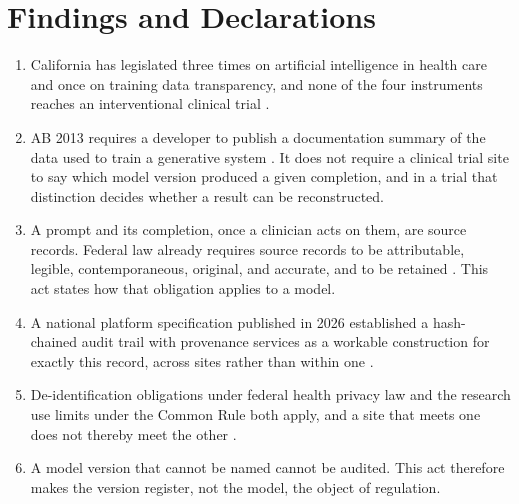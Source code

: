 
\section{Findings and Declarations}

\begin{enumerate}
\item California has legislated three times on artificial intelligence in
  health care and once on training data transparency, and none of the four
  instruments reaches an interventional clinical trial
  \cite{ab3030_2024,ab489_2025,sb1120_2024,ab2013_2024}.

\item AB 2013 requires a developer to publish a documentation summary of the
  data used to train a generative system \cite{ab2013_2024}. It does not require
  a clinical trial site to say which model version produced a given completion,
  and in a trial that distinction decides whether a result can be reconstructed.

\item A prompt and its completion, once a clinician acts on them, are source
  records. Federal law already requires source records to be attributable,
  legible, contemporaneous, original, and accurate, and to be retained
  \cite{cfr11,cfr312}. This act states how that obligation applies to a model.

\item A national platform specification published in 2026 established a
  hash-chained audit trail with provenance services as a workable construction
  for exactly this record, across sites rather than within one
  \cite{natplatform2026}.

\item De-identification obligations under federal health privacy law and the
  research use limits under the Common Rule both apply, and a site that meets one
  does not thereby meet the other \cite{cfr45part164,cfr45part46}.

\item A model version that cannot be named cannot be audited. This act therefore
  makes the version register, not the model, the object of regulation.
\end{enumerate}

